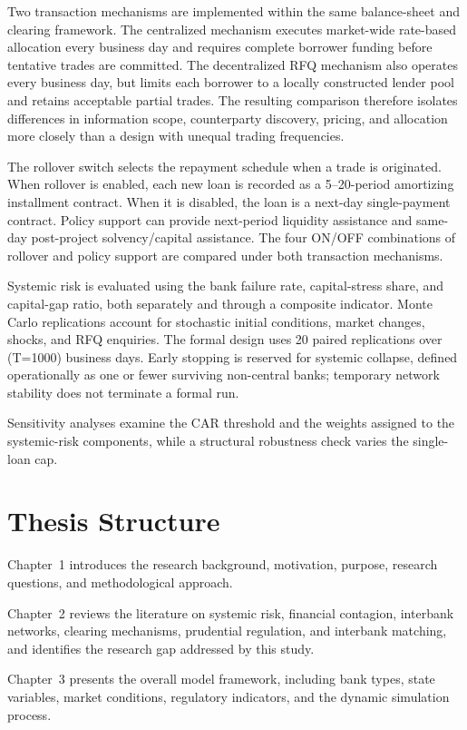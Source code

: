 Two transaction mechanisms are implemented within the same balance-sheet
and clearing framework. The centralized mechanism executes market-wide
rate-based allocation every business day and requires complete borrower
funding before tentative trades are committed. The decentralized RFQ
mechanism also operates every business day, but limits each borrower to a
locally constructed lender pool and retains acceptable partial trades.
The resulting comparison therefore isolates differences in information
scope, counterparty discovery, pricing, and allocation more closely than
a design with unequal trading frequencies.

The rollover switch selects the repayment schedule when a trade is
originated. When rollover is enabled, each new loan is recorded as a
5--20-period amortizing installment contract. When it is disabled, the
loan is a next-day single-payment contract. Policy support can provide
next-period liquidity assistance and same-day post-project
solvency/capital assistance. The four ON/OFF combinations of rollover and
policy support are compared under both transaction mechanisms.

Systemic risk is evaluated using the bank failure rate, capital-stress
share, and capital-gap ratio, both separately and through a composite
indicator. Monte Carlo replications account for stochastic initial
conditions, market changes, shocks, and RFQ enquiries. The formal design
uses 20 paired replications over (T=1000) business days. Early stopping is
reserved for systemic collapse, defined operationally as one or fewer
surviving non-central banks; temporary network stability does not terminate
a formal run.

Sensitivity analyses examine the CAR threshold and the weights assigned
to the systemic-risk components, while a structural robustness check
varies the single-loan cap.

\section{Thesis Structure}

Chapter~1 introduces the research background, motivation, purpose,
research questions, and methodological approach.

Chapter~2 reviews the literature on systemic risk, financial contagion,
interbank networks, clearing mechanisms, prudential regulation, and
interbank matching, and identifies the research gap addressed by this
study.

Chapter~3 presents the overall model framework, including bank types,
state variables, market conditions, regulatory indicators, and the
dynamic simulation process.

